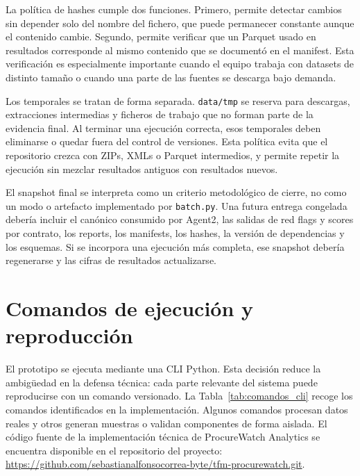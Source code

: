 \documentclass[11pt,a4paper,spanish]{book}
\numberwithin{equation}{chapter}
\numberwithin{figure}{chapter}
\begin{document}
La pol{\'i}tica de hashes cumple dos funciones. Primero, permite detectar cambios sin depender solo
del nombre del fichero, que puede permanecer constante aunque el contenido cambie. Segundo, permite
verificar que un Parquet usado en resultados corresponde al mismo contenido que se document{\'o} en el
manifest. Esta verificaci{\'o}n es especialmente importante cuando el equipo trabaja con datasets de
distinto tama{\~n}o o cuando una parte de las fuentes se descarga bajo demanda.

Los temporales se tratan de forma separada. \texttt{data/tmp} se reserva para descargas, extracciones
intermedias y ficheros de trabajo que no forman parte de la evidencia final. Al terminar una
ejecuci{\'o}n correcta, esos temporales deben eliminarse o quedar fuera del control de versiones. Esta
pol{\'i}tica evita que el repositorio crezca con ZIPs, XMLs o Parquet intermedios, y permite repetir
la ejecuci{\'o}n sin mezclar resultados antiguos con resultados nuevos.

El snapshot final se interpreta como un criterio metodol{\'o}gico de cierre, no como un modo o
artefacto implementado por \texttt{batch.py}. Una futura entrega congelada deber{\'i}a incluir el
can{\'o}nico consumido por Agent2, las salidas de red flags y scores por contrato, los reports, los
manifests, los hashes, la versi{\'o}n de dependencias y los esquemas. Si se incorpora una ejecuci{\'o}n
m{\'a}s completa, ese snapshot deber{\'i}a regenerarse y las cifras de resultados actualizarse.

\section{Comandos de ejecuci{\'o}n y reproducci{\'o}n}
\label{sec:comandos_reproduccion}

El prototipo se ejecuta mediante una CLI Python. Esta decisi{\'o}n reduce la ambig{\"u}edad en la
defensa t{\'e}cnica: cada parte relevante del sistema puede reproducirse con un comando versionado.
La Tabla~\ref{tab:comandos_cli} recoge los comandos identificados en la implementaci{\'o}n. Algunos
comandos procesan datos reales y otros generan muestras o validan componentes de forma aislada.
El c{\'o}digo fuente de la implementaci{\'o}n t{\'e}cnica de ProcureWatch Analytics se encuentra
disponible en el repositorio del proyecto:
\url{https://github.com/sebastianalfonsocorrea-byte/tfm-procurewatch.git}.
\end{document}
